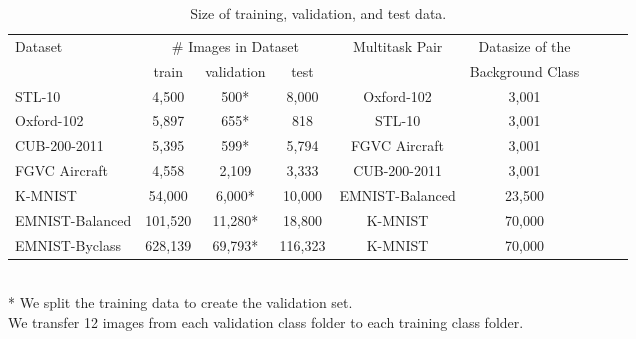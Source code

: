 \documentclass{article}
\begin{document}
\begin{table*}[t]
\caption{Size of training, validation, and test data.}
\label{Datasize}
\vskip 0.15in
\begin{center}
\begin{small}
\begin{sc}
\begin{tabular}{lcccccccr}
\toprule
Dataset  &\multicolumn{3}{c}{\# Images in Dataset} & Multitask Pair& Datasize of the \\
 &    train & validation & test & & Background Class \\
\midrule  
STL-10  &4,500&500*&8,000&Oxford-102 & 3,001 \\
Oxford-102 &5,897&655*&818&STL-10 & 3,001\\



CUB-200-2011 &5,395&599*&5,794&FGVC Aircraft& 3,001\\

FGVC Aircraft &4,558 &2,109 &3,333 &CUB-200-2011 & 3,001\\
K-MNIST  &54,000&6,000*&10,000&EMNIST-Balanced  & 23,500\\
EMNIST-Balanced &101,520&11,280*&18,800&K-MNIST & 70,000 \\
EMNIST-Byclass &628,139&69,793*&116,323&K-MNIST & 70,000 \\


\bottomrule
\end{tabular}
\\ * We split the training data to create the validation set. 
\\  We transfer 12 images from each validation class folder to each training class folder. 
\end{sc}
\end{small}
\end{center}
\vskip -0.1in
\end{table*}
\end{document}
